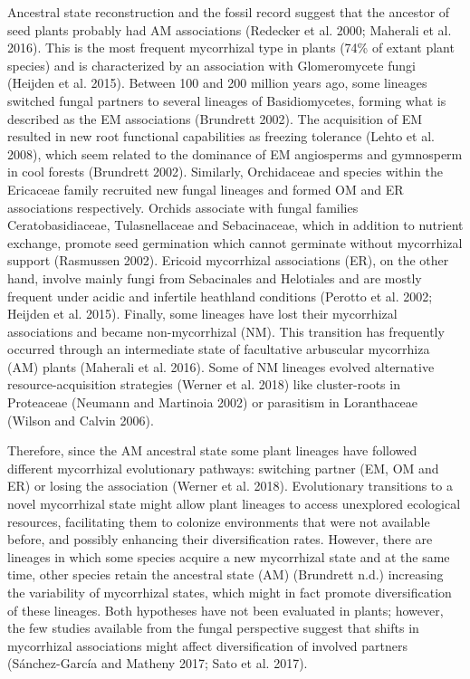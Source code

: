 \documentclass[12pt,]{article}
\begin{document}
Ancestral state reconstruction and the fossil record suggest that the
ancestor of seed plants probably had AM associations (Redecker et al.
2000; Maherali et al. 2016). This is the most frequent mycorrhizal type
in plants (74\% of extant plant species) and is characterized by an
association with Glomeromycete fungi (Heijden et al. 2015). Between 100
and 200 million years ago, some lineages switched fungal partners to
several lineages of Basidiomycetes, forming what is described as the EM
associations (Brundrett 2002). The acquisition of EM resulted in new
root functional capabilities as freezing tolerance (Lehto et al. 2008),
which seem related to the dominance of EM angiosperms and gymnosperm in
cool forests (Brundrett 2002). Similarly, Orchidaceae and species within
the Ericaceae family recruited new fungal lineages and formed OM and ER
associations respectively. Orchids associate with fungal families
Ceratobasidiaceae, Tulasnellaceae and Sebacinaceae, which in addition to
nutrient exchange, promote seed germination which cannot germinate
without mycorrhizal support (Rasmussen 2002). Ericoid mycorrhizal
associations (ER), on the other hand, involve mainly fungi from
Sebacinales and Helotiales and are mostly frequent under acidic and
infertile heathland conditions (Perotto et al. 2002; Heijden et al.
2015). Finally, some lineages have lost their mycorrhizal associations
and became non-mycorrhizal (NM). This transition has frequently occurred
through an intermediate state of facultative arbuscular mycorrhiza (AM)
plants (Maherali et al. 2016). Some of NM lineages evolved alternative
resource-acquisition strategies (Werner et al. 2018) like cluster-roots
in Proteaceae (Neumann and Martinoia 2002) or parasitism in Loranthaceae
(Wilson and Calvin 2006).

Therefore, since the AM ancestral state some plant lineages have
followed different mycorrhizal evolutionary pathways: switching partner
(EM, OM and ER) or losing the association (Werner et al. 2018).
Evolutionary transitions to a novel mycorrhizal state might allow plant
lineages to access unexplored ecological resources, facilitating them to
colonize environments that were not available before, and possibly
enhancing their diversification rates. However, there are lineages in
which some species acquire a new mycorrhizal state and at the same time,
other species retain the ancestral state (AM) (Brundrett n.d.)
increasing the variability of mycorrhizal states, which might in fact
promote diversification of these lineages. Both hypotheses have not been
evaluated in plants; however, the few studies available from the fungal
perspective suggest that shifts in mycorrhizal associations might affect
diversification of involved partners (Sánchez-García and Matheny 2017;
Sato et al. 2017).
\end{document}
